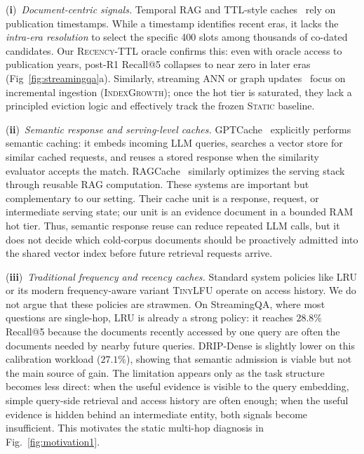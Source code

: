 (\textbf{i})~\emph{Document-centric signals.} Temporal RAG and TTL-style caches~\cite{hoh2025,dynaquest2025} rely on publication timestamps. While a timestamp identifies recent eras, it lacks the \emph{intra-era resolution} to select the specific 400 slots among thousands of co-dated candidates. Our \textsc{Recency-TTL} oracle confirms this: even with oracle access to publication years, post-R1 Recall@5 collapses to near zero in later eras (Fig~\ref{fig:streamingqa}a). Similarly, streaming ANN or graph updates~\cite{guo2024lightrag,guti2025hipporag2} focus on incremental ingestion (\textsc{IndexGrowth}); once the hot tier is saturated, they lack a principled eviction logic and effectively track the frozen \textsc{Static} baseline. 

(\textbf{ii})~\emph{Semantic response and serving-level caches.} GPTCache~\cite{bang2023gptcache} explicitly performs semantic caching: it embeds incoming LLM queries, searches a vector store for similar cached requests, and reuses a stored response when the similarity evaluator accepts the match. RAGCache~\cite{jin2024ragcache} similarly optimizes the serving stack through reusable RAG computation. These systems are important but complementary to our setting. Their cache unit is a response, request, or intermediate serving state; our unit is an evidence document in a bounded RAM hot tier. Thus, semantic response reuse can reduce repeated LLM calls, but it does not decide which cold-corpus documents should be proactively admitted into the shared vector index before future retrieval requests arrive. 

(\textbf{iii})~\emph{Traditional frequency and recency caches.} Standard system policies like \textsc{LRU} or its modern frequency-aware variant \textsc{TinyLFU} operate on access history. We do not argue that these policies are strawmen. On StreamingQA, where most questions are single-hop, \textsc{LRU} is already a strong policy: it reaches $28.8\%$ Recall@5 because the documents recently accessed by one query are often the documents needed by nearby future queries. DRIP-Dense is slightly lower on this calibration workload ($27.1\%$), showing that semantic admission is viable but not the main source of gain. The limitation appears only as the task structure becomes less direct: when the useful evidence is visible to the query embedding, simple query-side retrieval and access history are often enough; when the useful evidence is hidden behind an intermediate entity, both signals become insufficient. This motivates the static multi-hop diagnosis in Fig.~\ref{fig:motivation1}.

